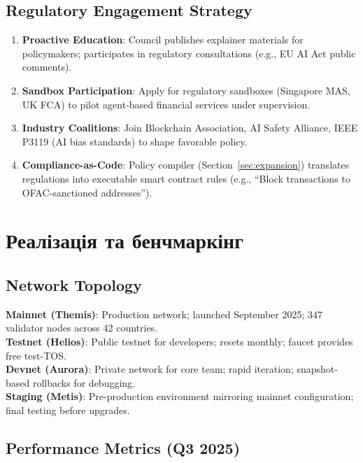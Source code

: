 \documentclass[11pt]{article}
\begin{document}
\subsection{Regulatory Engagement Strategy}

\begin{enumerate}[noitemsep]
  \item \textbf{Proactive Education}: Council publishes explainer materials for policymakers; participates in regulatory consultations (e.g., EU AI Act public comments).
  \item \textbf{Sandbox Participation}: Apply for regulatory sandboxes (Singapore MAS, UK FCA) to pilot agent-based financial services under supervision.
  \item \textbf{Industry Coalitions}: Join Blockchain Association, AI Safety Alliance, IEEE P3119 (AI bias standards) to shape favorable policy.
  \item \textbf{Compliance-as-Code}: Policy compiler (Section~\ref{sec:expansion}) translates regulations into executable smart contract rules (e.g., ``Block transactions to OFAC-sanctioned addresses'').
\end{enumerate}

\section{Реалізація та бенчмаркінг}
\label{sec:implementation}

\subsection{Network Topology}

\textbf{Mainnet (Themis)}: Production network; launched September 2025; 347 validator nodes across 42 countries.\\
\textbf{Testnet (Helios)}: Public testnet for developers; resets monthly; faucet provides free test-TOS.\\
\textbf{Devnet (Aurora)}: Private network for core team; rapid iteration; snapshot-based rollbacks for debugging.\\
\textbf{Staging (Metis)}: Pre-production environment mirroring mainnet configuration; final testing before upgrades.

\subsection{Performance Metrics (Q3 2025)}
\end{document}
